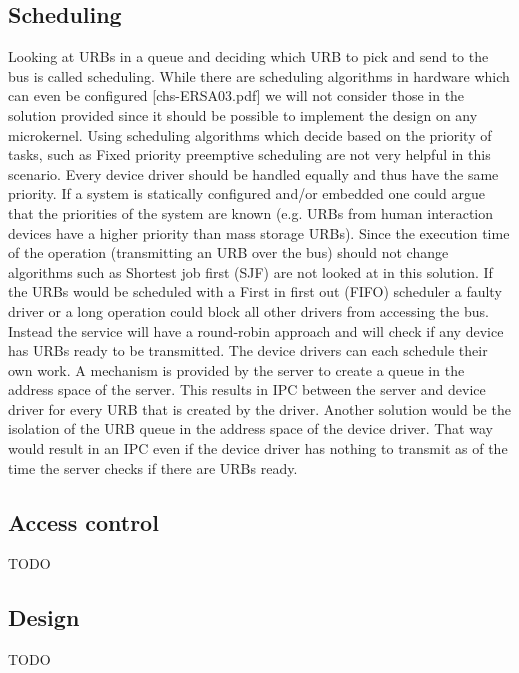 \documentclass{acm_proc_article-sp}
\begin{document}
\subsection{Scheduling}
Looking at URBs in a queue and deciding which URB to pick and send to the bus is called
scheduling.
While there are scheduling algorithms in hardware which can even be configured [chs-ERSA03.pdf]
we will not consider those in the solution provided since it should be possible to implement
the design on any microkernel.
Using scheduling algorithms which decide based on the priority of tasks, such as Fixed priority
preemptive scheduling are not very helpful in this scenario.
Every device driver should be handled equally and thus have the same priority.
If a system is statically configured and/or embedded one could argue that the priorities of
the system are known (e.g. URBs from human interaction devices have a higher priority than
mass storage URBs).
Since the execution time of the operation (transmitting an URB over the bus) should not change
algorithms such as Shortest job first (SJF) are not looked at in this solution.
If the URBs would be scheduled with a First in first out (FIFO) scheduler a faulty driver
or a long operation could block all other drivers from accessing the bus.
Instead the service will have a round-robin approach and will check if any device has URBs
ready to be transmitted.
The device drivers can each schedule their own work.
A mechanism is provided by the server to create a queue in the address space of the server.
This results in IPC between the server and device driver for every URB that is created by
the driver.
Another solution would be the isolation of the URB queue in the address space of the device
driver.
That way would result in an IPC even if the device driver has nothing to transmit as of the
time the server checks if there are URBs ready.

\subsection{Access control}
TODO

\subsection{Design}
TODO
\end{document}
